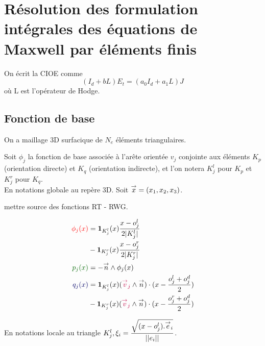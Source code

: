 \section{Résolution des formulation intégrales des équations de Maxwell par éléments finis}
On écrit la CIOE comme
\[
  (I_d + bL)E_t = (a_0I_d+a_1L)J
\]
où L est l'opérateur de Hodge.
\subsection{Fonction de base}
On a maillage 3D surfacique de \(N_e\) éléments triangulaires.

Soit \(\phi_j\) la fonction de base associée à l’arête orientée \(v_j\) conjointe aux éléments \(K_p\) (orientation directe) et \(K_q\) (orientation indirecte), et l'on notera \(K_j^l\) pour \(K_p\) et \(K_j^r\) pour \(K_q\).\\

En notations globale au repère 3D. 
Soit \(\vect x = (x_1,x_2,x_3)\).

\begin{TODO}
  mettre source des fonctions RT - RWG.
\end{TODO}

\begin{minipage}{0.4\textwidth}
\begin{align*}
	\color{red}{\phi_j(x)} &= \mathbf{1}_{K_j^l}(x)\frac{x-o_j^l}{2|K_j^l|} \\&- \mathbf{1}_{K_j^r}(x)\frac{x-o_j^r}{2|K_j^r|}\\
	\color{black!60!green}{p_j(x)} &= -\vn \pvect \phi_j(x)\\
	\color{black!60!blue}{q_j(x)} &= \mathbf{1}_{K_j^l}(x) ( { \color{purple}{\vect{v}_j } } \pvect \vn ) \cdot ( x - \frac{o^l_j + o^d_j}{2} ) \\
 &- \mathbf{1}_{K_j^r}(x) ( { \color{purple}{\vect{v}_j } } \pvect \vn ) \cdot ( x - \frac{o^r_j + o^d_j}{2} )
\end{align*}
\end{minipage}
\begin{minipage}{0.58\textwidth}
	\centering
	\begin{tikzpicture}[scale=2.5]
	
	\end{tikzpicture}
\end{minipage} 

En notations locale au triangle \(K_j^l, \xi_i = \frac{\sqrt{(x-o^l_j).\vect e_i}}{||e_i||}\).


